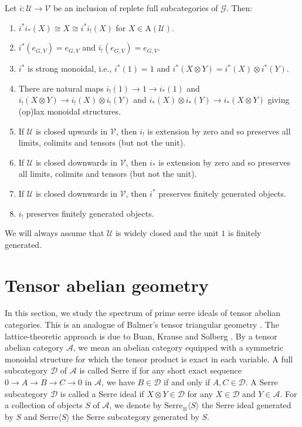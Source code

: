\documentclass[11pt,a4paper]{amsart}
\numberwithin{equation}{section} \theoremstyle{plain}
\begin{document}
Let $i:\mathcal{U}\rightarrow \mathcal{V}$ be an inclusion of replete full subcategories of $\mathcal{G}$. Then:
\begin{enumerate}
\item $i^{*}i_{*}(X)\cong X\cong i^{*}i_{!}(X)$ for $X\in \mathrm{A}(\mathcal{U})$.

\item $i^{*}(e_{G,V})=e_{G,V}$ and $i_{!}(e_{G,V})=e_{G,V}$.

\item $i^{*}$  is strong monoidal, i.e., $i^{*}(\mathrm{1})=\mathrm{1}$ and $i^{*}(X\otimes Y)=i^{*}(X)\otimes i^{*}(Y)$.

\item There are natural maps $i_{!}(\mathrm{1})\rightarrow \mathrm{1}\rightarrow i_{*}(\mathrm{1})$ and $i_{!}(X\otimes Y)\rightarrow i_{!}(X)\otimes i_{!}(Y)$ and $i_{*}(X)\otimes i_{*}(Y)\rightarrow i_{*}(X\otimes Y)$ giving (op)lax monoidal structures.

\item If $\mathcal{U}$  is closed upwards in $\mathcal{V}$, then $i_{!}$ is extension by zero and so preserves  all limits, colimits and tensors (but not the unit).

\item If $\mathcal{U}$  is closed downwards in $\mathcal{V}$, then $i_{*}$ is extension by zero and so preserves all limits, colimits and tensors (but not the unit).

\item If $\mathcal{U}$  is closed downwards in $\mathcal{V}$, then $i^{*}$  preserves finitely generated objects.

\item $i_{!}$  preserves finitely generated objects.
\end{enumerate}
We will always assume that $\mathcal{U}$  is widely closed and the unit $\mathrm{1}$ is finitely generated.



 \section{\bf Tensor abelian geometry}
In this section, we study the spectrum of prime serre ideals of tensor abelian categories. This is an analogue of Balmer's tensor triangular geometry \cite{Bal05}. The lattice-theoretic approach is due to Buan, Krause and  Solberg \cite{BKS}. By a tensor abelian category $\mathcal{A}$, we mean an abelian category equipped with a symmetric monoidal structure for which the tensor product is exact in each variable. A full subcategory $\mathcal{D}$ of $\mathcal{A}$ is called Serre if for any short exact sequence $0\rightarrow A\rightarrow B \rightarrow C\rightarrow 0$ in $\mathcal{A}$, we have $B\in \mathcal{D}$ if and only if $A,C\in \mathcal{D}$. A Serre subcategory $\mathcal{D}$ is called a Serre ideal if $X\otimes Y\in \mathcal{D}$ for any $X\in \mathcal{D}$ and $Y\in \mathcal{A}$.  For a collection of objects $S$ of $\mathcal{A}$, we denote by $\mathrm{Serre}_{\otimes}\langle S\rangle$ the Serre ideal generated by $S$ and $\mathrm{Serre}\langle S\rangle$ the Serre subcategory generated by $S$.
\end{document}
